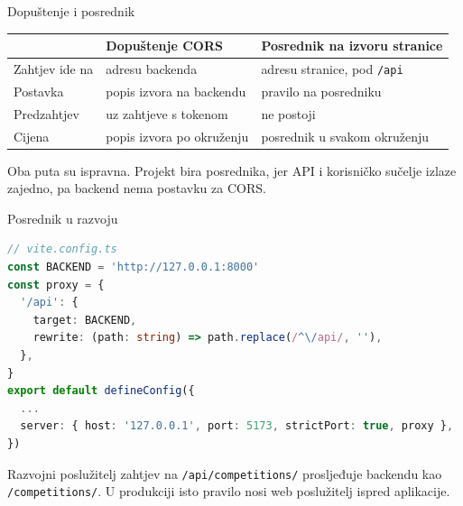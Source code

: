\begin{frame}{Dopuštenje i posrednik}
\vspace{0.3em}
\begin{center}
{\small
\setlength{\tabcolsep}{6pt}
\renewcommand{\arraystretch}{1.3}
\begin{tabular}{@{}L{2.4cm}L{4.0cm}L{5.0cm}@{}}
  \toprule
   & \textbf{Dopuštenje CORS} & \textbf{Posrednik na izvoru stranice} \\
  \midrule
  Zahtjev ide na & adresu backenda & adresu stranice, pod \texttt{/api} \\
  Postavka & popis izvora na backendu & pravilo na posredniku \\
  Predzahtjev & uz zahtjeve s tokenom & ne postoji \\
  Cijena & popis izvora po okruženju & posrednik u svakom okruženju \\
  \bottomrule
\end{tabular}
}
\end{center}

\vspace{0.6em}
\begin{konvencija}
Oba puta su ispravna. Projekt bira posrednika, jer API i korisničko sučelje izlaze zajedno, pa backend nema postavku za CORS.
\end{konvencija}
\end{frame}

\begin{frame}[fragile]{Posrednik u razvoju}
\begin{lstlisting}[language=typescript]
// vite.config.ts
const BACKEND = 'http://127.0.0.1:8000'
const proxy = {
  '/api': {
    target: BACKEND,
    rewrite: (path: string) => path.replace(/^\/api/, ''),
  },
}
export default defineConfig({
  ...
  server: { host: '127.0.0.1', port: 5173, strictPort: true, proxy },
})
\end{lstlisting}

\vspace{0.3em}
Razvojni poslužitelj zahtjev na \texttt{/api/competitions/} prosljeđuje backendu kao \texttt{/competitions/}. U produkciji isto pravilo nosi web poslužitelj ispred aplikacije.
\end{frame}

